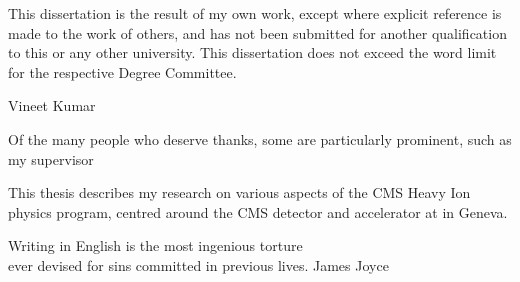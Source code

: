 \begin{declaration}
  This dissertation is the result of my own work, except where explicit
  reference is made to the work of others, and has not been submitted
  for another qualification to this or any other university. This
  dissertation does not exceed the word limit for the respective Degree
  Committee.
  \vspace*{1cm}
  \begin{flushright}
    Vineet Kumar
  \end{flushright}
\end{declaration}


\begin{acknowledgements}
  Of the many people who deserve thanks, some are particularly prominent,
  such as my supervisor
\end{acknowledgements}


\begin{preface}
  This thesis describes my research on various aspects of the CMS
  Heavy Ion physics program, centred around the CMS detector and \LHC
  accelerator at \CERN in Geneva.
  \noindent
\end{preface}

\tableofcontents

\frontquote%
  {Writing in English is the most ingenious torture\\
   ever devised for sins committed in previous lives.}%
  {James Joyce}

  
